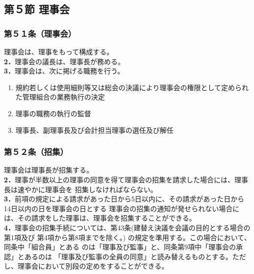 \documentclass[
  luatex,
  paper=a4paper,
  fontsize=11pt,
  jafontsize=10pt,
  jlreq_notes,
]{jlreq}
\begin{document}
  \begin{center}
  \subsection*{第５節 理事会}
  \end{center}
  \subsubsection*{第５１条（理事会）}
  理事会は、理事をもって構成する。\\
  \textbf{2．}理事会の議長は、理事長が務める。\\
  \textbf{3．}理事会は、次に掲げる職務を行う。
  \begin{enumerate}
    \item 規約若しくは使用細則等又は総会の決議により理事会の権限として定められた管理組合の業務執行の決定
    \item 理事の職務の執行の監督
    \item 理事長、副理事長及び会計担当理事の選任及び解任
  \end{enumerate}
  \subsubsection*{第５２条（招集）}
  理事会は理事長が招集する。\\
  \textbf{2．}理事が半数以上の理事の同意を得て理事会の招集を請求した場合には、理事長は速やかに理事会を
  招集しなければならない。\\
  \textbf{3．}前項の規定による請求があった日から5日以内に、その請求があった日から14日以内の日を理事会の日とする
  理事会の招集の通知が発せられない場合には、その請求をした理事は、理事会を招集することができる。\\
  \textbf{4．}理事会の招集手続については、第43条(建替え決議を会議の目的とする場合の第1項及び 第4項から第8項までを除く。)
  の規定を準用する。この場合において、同条中「組合員」とある のは「理事及び監事」と、同条第9項中「理事会の承認」とあるのは
  「理事及び監事の全員の同意」と読み替えるものとする。ただし、理事会において別段の定めをすることができる。
\end{document}
